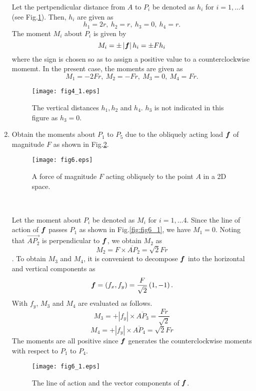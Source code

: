 \documentclass[10pt,a4j]{article}
\begin{document}
\begin{enumerate}
	{\small
		Let the pertpendicular distance from $A$ to $P_i$ be 
		denoted as $h_i$ for $i=1,\dots 4$(see Fig.\ref{fig:fig4_1}). 
		Then, $h_i$ are given as 
		\[
			h_1=2r, \ h_2=r, \ h_3=0, \ h_4=r.
		\]
		The moment $M_i$ about $P_i$ is given by 
		\[
			M_i=\pm \left| \mbox{\boldmath $f$} \right| h_i= \pm Fh_i
		\]	
		where the sign is chosen so as to assign a positive value to a counterclockwise momemt.
		In the present case, the moments are given as
		\[
			M_1=-2Fr, \ M_2=-Fr, \ M_3=0, \ M_4=Fr.
		\]
		\begin{figure}[h]
		\begin{center}
		\texttt{[image: fig4\_1.eps]} 
		\end{center}
			\caption{The vertical distances $h_1,h_2$ and $h_4$. $h_3$ is not 
			indicated in this figure as $h_3=0$.}
		\label{fig:fig4_1}
		\end{figure}
	}
\item
	Obtain the moments about $P_1$ to $P_5$ due to the obliquely acting load $\mbox{\boldmath $f$}$ 
	of magnitude $F$ as shown in Fig.\ref{fig:fig6}.
	\begin{figure}[h]
		\begin{center}
		\texttt{[image: fig6.eps]} 
		\end{center}
		\caption{A force of magnitude $F$ acting obliquely to the point $A$ in a 2D space.} 
		\label{fig:fig6}
	\end{figure}
	\\
	{\small
		Let the moment about $P_i$ be  denoted as $M_i$ for $i=1,\dots 4$.
		Since the line of action of $\mbox{\boldmath $f$}$ passes $P_1$ as shown in Fig.\ref{fig:fig6_1}, 
		we have $M_1=0$.
		Noting that $\overrightarrow{AP_2}$ is perpendicular to $\mbox{\boldmath $f$}$, 
		we obtain $M_2$ as 
		\[ 
			M_2=F\times \overline{AP}_2=\sqrt{2}Fr
		\].
		To obtain $M_3$ and $M_4$, it is convenient to decompose $\mbox{\boldmath $f$}$ into 
		the horizontal and vertical components as 
		\[
			\mbox{\boldmath $f$}=(f_x,f_y)=\frac{F}{\sqrt{2}}\left(1, -1\right).
		\]
		With $f_y$, $M_3$ and $M_4$ are evaluated as follows.
		\[
			M_3=+\left|f_y\right| \times \overline{A P_3}=\frac{Fr}{\sqrt{2}}
		\]
		\[
			M_4=+\left|f_y \right| \times \overline{A P_4}=\sqrt{2}Fr
		\]
		The moments are all positive since $\mbox{\boldmath $f$}$ generates the counterclockwise moments 
		with respect to $P_1$ to $P_4$.
		\begin{figure}[h]
		\begin{center}
		\texttt{[image: fig6\_1.eps]} 
		\end{center}
			\caption{The line of action and the vector components of $\mbox{\boldmath $f$}$.} 

\end{figure}}
\end{enumerate}
\end{document}
